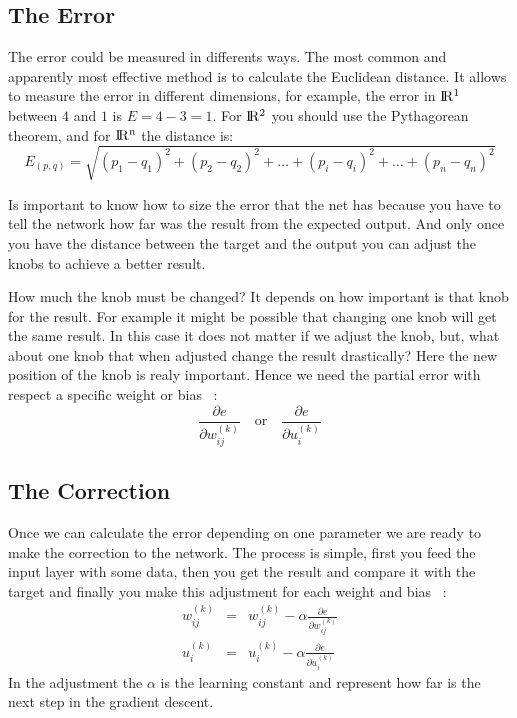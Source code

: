 \subsection{The Error}
The error could be measured in differents ways. The most common and apparently most effective method is to calculate the Euclidean distance. It allows to measure the error in different dimensions, for example, the error in $\rm I\!R^1$ between $4$ and $1$ is $E=4-3=1$. For $\rm I\!R^2$ you should use the Pythagorean theorem, and for $\rm I\!R^n$ the distance is:
\begin{equation}
  E_{(p,q)}=\sqrt{(p_1-q_1)^2+(p_2-q_2)^2+\dots+(p_i-q_i)^2+\dots+(p_n-q_n)^2}
\end{equation}

Is important to know how to size the error that the net has because you have to tell the network how far was the result from the expected output. And only once you have the distance between the target and the output you can adjust the knobs to achieve a better result.

How much the knob must be changed? It depends on how important is that knob for the result. For example it might be possible that changing one knob will get the same result. In this case it does not matter if we adjust the knob, but, what about one knob that when adjusted change the result drastically? Here the new position of the knob is realy important. Hence we need the partial error with respect a specific weight or bias ~\cite[Chapter~2]{nielsen}:
\begin{equation}
  \frac{\partial e}{\partial w^{(k)}_{ij}} \quad \textrm{or} \quad \frac{\partial e}{\partial u^{(k)}_{i}}
\end{equation}

\subsection{The Correction}
Once we can calculate the error depending on one parameter we are ready to make the correction to the network. The process is simple, first you feed the input layer with some data, then you get the result and compare it with the target and finally you make this adjustment for each weight and bias ~\cite[Chapter~7]{rojas}:
\begin{equation}
\begin{aligned}
  w^{(k)}_{ij} & = & w^{(k)}_{ij} - \alpha \frac{\partial e}{\partial w^{(k)}_{ij}} \\
  u^{(k)}_{i} & = & u^{(k)}_{i} - \alpha \frac{\partial e}{\partial u^{(k)}_{i}}
\end{aligned}
\end{equation}
In the adjustment the $\alpha$ is the learning constant and represent how far is the next step in the gradient descent.
